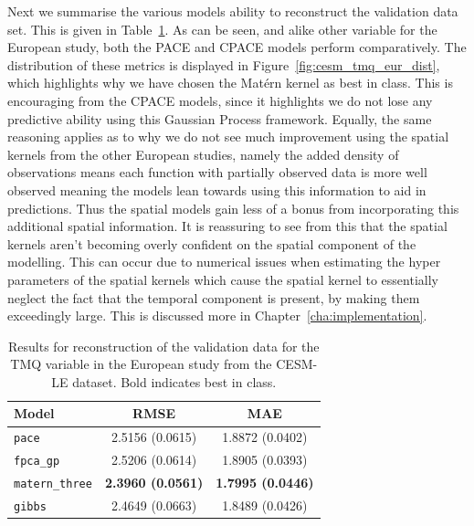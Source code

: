 Next we summarise the various models ability to reconstruct the validation data set.
This is given in Table~\ref{tab:train_cesm_tmq_eur}.
As can be seen, and alike other variable for the European study, both the PACE and CPACE models perform comparatively.
The distribution of these metrics is displayed in Figure~\ref{fig:cesm_tmq_eur_dist}, which highlights why we have chosen the Mat\'ern kernel as best in class.
This is encouraging from the CPACE models, since it highlights we do not lose any predictive ability using this Gaussian Process framework.
Equally, the same reasoning applies as to why we do not see much improvement using the spatial kernels from the other European studies, namely the added density of observations means each function with partially observed data is more well observed meaning the models lean towards using this information to aid in predictions.
Thus the spatial models gain less of a bonus from incorporating this additional spatial information.
It is reassuring to see from this that the spatial kernels aren't becoming overly confident on the spatial component of the modelling.
This can occur due to numerical issues when estimating the hyper parameters of the spatial kernels which cause the spatial kernel to essentially neglect the fact that the temporal component is present, by making them exceedingly large.
This is discussed more in Chapter~\ref{cha:implementation}.

\begin{table}
	\caption[Results for the TMQ variable on validation data in the European study.]{Results for reconstruction of the validation data for the TMQ variable in the European study from the CESM-LE dataset. Bold indicates best in class.}
	\centering
	\label{tab:train_cesm_tmq_eur}
	\begin{tabular}{lcc}
		\toprule
		\textbf{Model} & \textbf{RMSE} & \textbf{MAE} \\
		\midrule
		\verb*|pace| & 2.5156 (0.0615) & 1.8872	(0.0402) \\
		\verb*|fpca_gp| & 2.5206 (0.0614) & 1.8905 (0.0393) \\
		\verb*|matern_three| & \textbf{2.3960 (0.0561)} & \textbf{1.7995 (0.0446)}\\
		\verb*|gibbs| & 2.4649 (0.0663) & 1.8489 (0.0426)\\
		\bottomrule
	\end{tabular}
\end{table}


